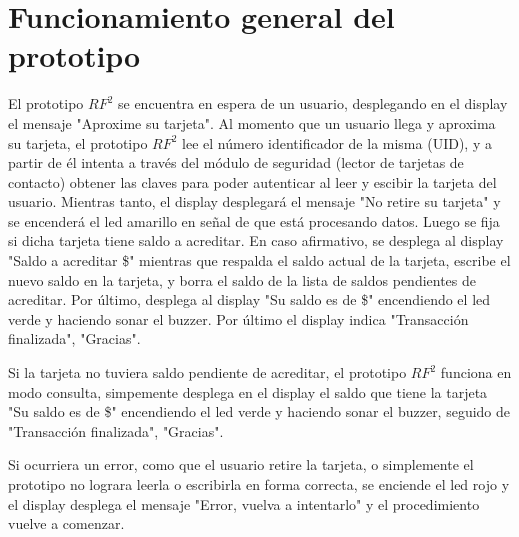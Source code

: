 \section{Funcionamiento general del prototipo}
El prototipo $RF^{2}$ se encuentra en espera de un usuario, desplegando en el display el mensaje "Aproxime su tarjeta". Al momento que un usuario llega y aproxima su tarjeta, el prototipo $RF^{2}$ lee el número identificador de la misma (UID), y a partir de él intenta a través del módulo de seguridad (lector de tarjetas de contacto) obtener las claves para poder autenticar al leer y escibir la tarjeta del usuario. Mientras tanto, el display desplegará el mensaje "No retire su tarjeta" y se encenderá el led amarillo en señal de que está procesando datos. Luego se fija si dicha tarjeta tiene saldo a acreditar. En caso afirmativo, se desplega al display "Saldo a acreditar \$<saldo correspondiente>" mientras que respalda el saldo actual de la tarjeta, escribe el nuevo saldo en la tarjeta, y borra el saldo de la lista de saldos pendientes de acreditar. Por último, desplega al display "Su saldo es de \$<saldo correspondiente>" encendiendo el led verde y haciendo sonar el buzzer. Por último el display indica "Transacción finalizada", "Gracias".

Si la tarjeta no tuviera saldo pendiente de acreditar, el prototipo $RF^{2}$ funciona en modo consulta, simpemente desplega en el display el saldo que tiene la tarjeta "Su saldo es de \$<saldo correspondiente>" encendiendo el led verde y haciendo sonar el buzzer, seguido de "Transacción finalizada", "Gracias".

Si ocurriera un error, como que el usuario retire la tarjeta, o simplemente el prototipo no lograra leerla o escribirla en forma correcta, se enciende el led rojo y el display desplega el mensaje "Error, vuelva a intentarlo" y el procedimiento vuelve a comenzar.
